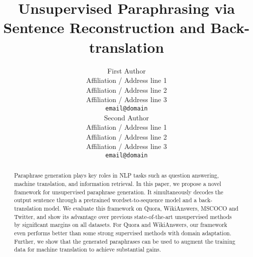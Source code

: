 \documentclass[11pt,a4paper]{article}
\title{Unsupervised Paraphrasing via Sentence Reconstruction and
Back-translation}
\author{First Author \\
  Affiliation / Address line 1 \\
  Affiliation / Address line 2 \\
  Affiliation / Address line 3 \\
  \texttt{email@domain} \\\And
  Second Author \\
  Affiliation / Address line 1 \\
  Affiliation / Address line 2 \\
  Affiliation / Address line 3 \\
  \texttt{email@domain} \\}
\date{}
\begin{document}
\maketitle
\begin{abstract}
Paraphrase generation plays key roles in NLP tasks such as question answering, machine translation, and information retrieval. In this paper, we propose a novel framework for unsupervised paraphrase generation. It simultaneously 
decodes the output sentence through a pretrained wordset-to-sequence model and 
a back-translation model. We evaluate this framework on Quora, WikiAnswers, MSCOCO and Twitter, and show its advantage over previous state-of-the-art unsupervised methods by significant margins on all datasets. For Quora and WikiAnswers, our framework even performs better than some strong supervised methods with domain adaptation. Further, we show that the generated paraphrases can be used to augment the training data for machine translation to achieve substantial gains.
\end{abstract}










\end{document}
